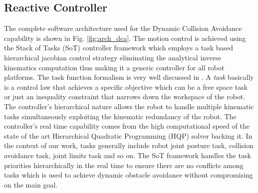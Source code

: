 \subsection{Reactive Controller}
The complete software architecture used for the Dynamic Collision Avoidance capability is shown in Fig. \ref{fig:arch_dca}. The motion control is achieved using the Stack of Tasks (SoT) controller framework \cite{Mansard2009} which employs a task based hierarchical jacobian control strategy eliminating the analytical inverse kinematics computation thus making it a generic controller for all robot platforms. 
The task function formalism is very well discussed in \cite{C.Samson1991}. A \emph{task} basically is a control law that achieves a specific objective which can be a free space task or just an inequality constraint that narrows down the workspace of the robot. The controller's hierarchical nature allows the robot to handle multiple kinematic tasks simultaneously exploiting the kinematic redundancy of the robot. The controller's real time capability comes from the high computational speed of the state of the art Hierarchical Quadratic Programming (HQP) solver backing it. In the context of our work, tasks generally include robot joint posture task, collision avoidance task, joint limits task and so on. The SoT framework handles the task priorities hierarchically in the real time to ensure there are no conflicts among tasks which is used to achieve dynamic obstacle avoidance without compromising on the main goal.

